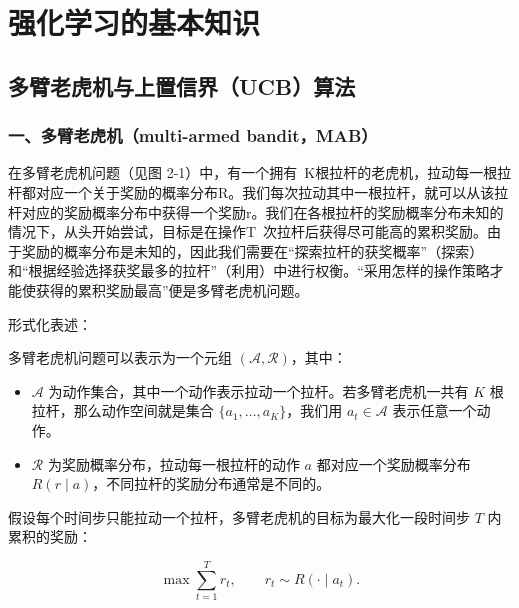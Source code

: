 \hypertarget{ux5f3aux5316ux5b66ux4e60ux7684ux57faux672cux77e5ux8bc6}{%
\chapter{强化学习的基本知识}\label{ux5f3aux5316ux5b66ux4e60ux7684ux57faux672cux77e5ux8bc6}}

\hypertarget{ux591aux81c2ux8001ux864eux673aux4e0eux4e0aux7f6eux4fe1ux754cucbux7b97ux6cd5}{%
\section{多臂老虎机与上置信界（UCB）算法}\label{ux591aux81c2ux8001ux864eux673aux4e0eux4e0aux7f6eux4fe1ux754cucbux7b97ux6cd5}}

\hypertarget{ux4e00ux591aux81c2ux8001ux864eux673amulti-armed-banditmab}{%
\subsection{一、多臂老虎机（multi-armed bandit，MAB）}\label{ux4e00ux591aux81c2ux8001ux864eux673amulti-armed-banditmab}}

在多臂老虎机问题（见图 2-1）中，有一个拥有~K根拉杆的老虎机，拉动每一根拉杆都对应一个关于奖励的概率分布R。我们每次拉动其中一根拉杆，就可以从该拉杆对应的奖励概率分布中获得一个奖励r。我们在各根拉杆的奖励概率分布未知的情况下，从头开始尝试，目标是在操作T~次拉杆后获得尽可能高的累积奖励。由于奖励的概率分布是未知的，因此我们需要在``探索拉杆的获奖概率''（探索）和``根据经验选择获奖最多的拉杆''（利用）中进行权衡。``采用怎样的操作策略才能使获得的累积奖励最高''便是多臂老虎机问题。

形式化表述：

多臂老虎机问题可以表示为一个元组 \((\mathcal{A}, \mathcal{R})\)，其中：

\begin{itemize}
\tightlist
\item
  \(\mathcal{A}\) 为动作集合，其中一个动作表示拉动一个拉杆。若多臂老虎机一共有 \(K\) 根拉杆，那么动作空间就是集合 \(\{a_1,\ldots,a_K\}\)，我们用 \(a_t \in \mathcal{A}\) 表示任意一个动作。
\item
  \(\mathcal{R}\) 为奖励概率分布，拉动每一根拉杆的动作 \(a\) 都对应一个奖励概率分布 \(R(r\mid a)\)，不同拉杆的奖励分布通常是不同的。
\end{itemize}

假设每个时间步只能拉动一个拉杆，多臂老虎机的目标为最大化一段时间步 \(T\) 内累积的奖励：

\[
\max \sum_{t=1}^{T} r_t,\qquad r_t \sim R(\cdot\mid a_t).
\]

